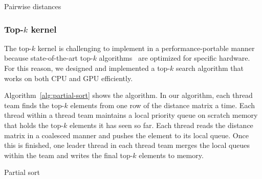 \documentclass[conference]{IEEEtran}
\begin{document}
\begin{algorithm}
    \SetAlgoLined
    \DontPrintSemicolon
    \caption{Pairwise distances}%
    \label{alg:distances}
\end{algorithm}

\subsubsection{Top-$k$ kernel}

The top-$k$ kernel is challenging to implement in a performance-portable manner
because state-of-the-art top-$k$ algorithms~\cite{Johnson2019,Shanbhag2018} are
optimized for specific hardware. For this reason, we designed and implemented a
top-$k$ search algorithm that works on both CPU and GPU efficiently.

Algorithm~\ref{alg:partial-sort} shows the algorithm. In our algorithm, each
thread team finds the top-$k$ elements from one row of the distance matrix a
time. Each thread within a thread team maintains a local priority queue on
scratch memory that holds the top-$k$ elements it has seen so far. Each thread
reads the distance matrix in a coalesced manner and pushes the element to its
local queue. Once this is finished, one leader thread in each thread team merges
the local queues within the team and writes the final top-$k$ elements to
memory.



\begin{algorithm}
    \SetAlgoLined
    \DontPrintSemicolon
    \caption{Partial sort}%
    \label{alg:partial-sort}
\end{algorithm}
\end{document}
